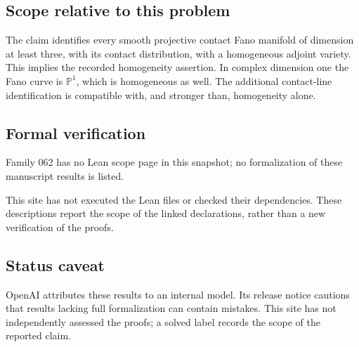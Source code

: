 \documentclass[11pt]{article}
\begin{document}
\subsection{Scope relative to this problem}
The claim identifies every smooth projective contact Fano manifold of dimension at least three, with its contact distribution, with a homogeneous adjoint variety. This implies the recorded homogeneity assertion. In complex dimension one the Fano curve is $\mathbb P^1$, which is homogeneous as well. The additional contact-line identification is compatible with, and stronger than, homogeneity alone.

\subsection{Formal verification}
Family 062 has no Lean scope page in this snapshot; no formalization of these manuscript results is listed.

This site has not executed the Lean files or checked their dependencies. These descriptions report the scope of the linked declarations, rather than a new verification of the proofs.

\subsection{Status caveat}
OpenAI attributes these results to an internal model. Its release notice cautions that results lacking full formalization can contain mistakes. This site has not independently assessed the proofs; a solved label records the scope of the reported claim.
\end{document}
